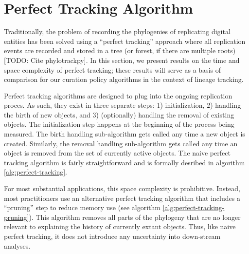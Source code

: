 \section{Perfect Tracking Algorithm} \label{sec:perfect-tracking}

Traditionally, the problem of recording the phylogenies of replicating digital 
entities has been solved using a ``perfect tracking'' approach where all replication 
events are recorded and stored in a tree (or forest, if there are multiple roots) [TODO: Cite phylotrackpy].
In this section, we present results on the time and space complexity of perfect tracking;
these results will serve as a basis of comparison for our curation policy algorithms in the context
of lineage tracking.

Perfect tracking algorithms are designed to plug into the ongoing replication proces.
As such, they exist in three separate steps: 1) initialization, 2) handling the birth of new objects, and 3) (optionally) handling the removal of existing objects.
The initialization step happens at the beginning of the process being measured.
The birth handling sub-algorithm gets called any time a new object is created.
Similarly, the removal handling sub-algorithm gets called any time an object is removed from the set of currently active objects.
The naive perfect tracking algorithm is fairly straightforward and is formally desribed in algorithm \ref{alg:perfect-tracking}. 





For most substantial applications, this space complexity is prohibitive.
Instead, most practitioners use an alternative perfect tracking algorithm that includes a ``pruning'' step to reduce memory use (see algorithm \ref{alg:perfect-tracking-pruning}).
This algorithm removes all parts of the phylogeny that are no longer relevant to explaining the history of currently extant objects.
Thus, like naive perfect tracking, it does not introduce any uncertainty into down-stream analyses.


